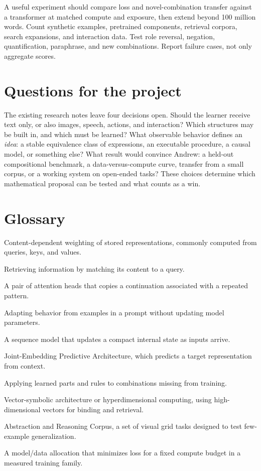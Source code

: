 A useful experiment should compare loss and novel-combination transfer against a transformer at matched compute and exposure, then extend beyond 100 million words. Count synthetic examples, pretrained components, retrieval corpora, search expansions, and interaction data. Test role reversal, negation, quantification, paraphrase, and new combinations. Report failure cases, not only aggregate scores.

\section{Questions for the project}
The existing research notes leave four decisions open. Should the learner receive text only, or also images, speech, actions, and interaction? Which structures may be built in, and which must be learned? What observable behavior defines an \emph{idea}: a stable equivalence class of expressions, an executable procedure, a causal model, or something else? What result would convince Andrew: a held-out compositional benchmark, a data-versus-compute curve, transfer from a small corpus, or a working system on open-ended tasks? These choices determine which mathematical proposal can be tested and what counts as a win.

\section{Glossary}
\begin{description}[style=nextline]
\item[Attention] Content-dependent weighting of stored representations, commonly computed from queries, keys, and values.
\item[Content-addressable recall] Retrieving information by matching its content to a query.
\item[Induction head] A pair of attention heads that copies a continuation associated with a repeated pattern.
\item[In-context learning] Adapting behavior from examples in a prompt without updating model parameters.
\item[State-space model] A sequence model that updates a compact internal state as inputs arrive.
\item[JEPA] Joint-Embedding Predictive Architecture, which predicts a target representation from context.
\item[Compositional generalization] Applying learned parts and rules to combinations missing from training.
\item[VSA/HDC] Vector-symbolic architecture or hyperdimensional computing, using high-dimensional vectors for binding and retrieval.
\item[ARC] Abstraction and Reasoning Corpus, a set of visual grid tasks designed to test few-example generalization.
\item[Compute-optimal] A model/data allocation that minimizes loss for a fixed compute budget in a measured training family.
\end{description}

